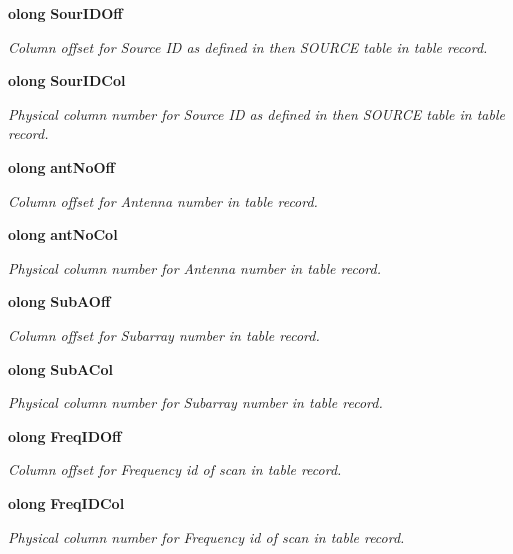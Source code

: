 \begin{CompactItemize}
{\bf olong} {\bf Sour\-IDOff}
\begin{CompactList}\small\item\em Column offset for Source ID as defined in then SOURCE table in table record. \item\end{CompactList}\item 
{\bf olong} {\bf Sour\-IDCol}
\begin{CompactList}\small\item\em Physical column number for Source ID as defined in then SOURCE table in table record. \item\end{CompactList}\item 
{\bf olong} {\bf ant\-No\-Off}
\begin{CompactList}\small\item\em Column offset for Antenna number in table record. \item\end{CompactList}\item 
{\bf olong} {\bf ant\-No\-Col}
\begin{CompactList}\small\item\em Physical column number for Antenna number in table record. \item\end{CompactList}\item 
{\bf olong} {\bf Sub\-AOff}
\begin{CompactList}\small\item\em Column offset for Subarray number in table record. \item\end{CompactList}\item 
{\bf olong} {\bf Sub\-ACol}
\begin{CompactList}\small\item\em Physical column number for Subarray number in table record. \item\end{CompactList}\item 
{\bf olong} {\bf Freq\-IDOff}
\begin{CompactList}\small\item\em Column offset for Frequency id of scan in table record. \item\end{CompactList}\item 
{\bf olong} {\bf Freq\-IDCol}
\begin{CompactList}\small\item\em Physical column number for Frequency id of scan in table record. \item\end{CompactList}\item 

\end{CompactItemize}
